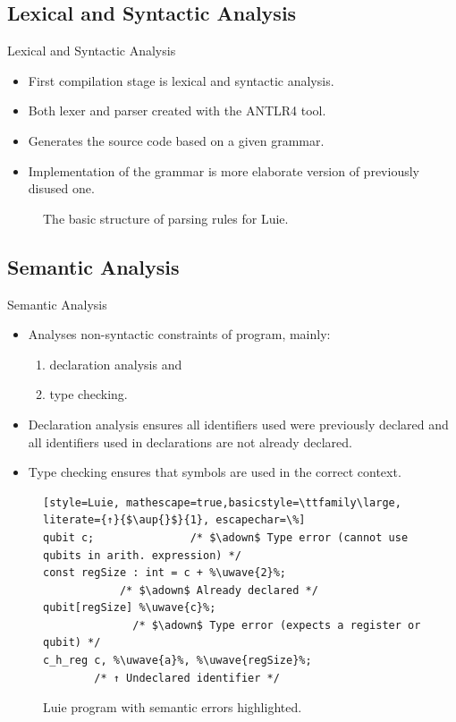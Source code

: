 \subsection{Lexical and Syntactic Analysis}
\begin{frame}{Lexical and Syntactic Analysis}
    \begin{itemize}
        \item First compilation stage is lexical and syntactic analysis.
        \item Both lexer and parser created with the ANTLR4 tool.
        \item Generates the source code based on a given grammar. 
        \item Implementation of the grammar is more elaborate version of previously disused one.
    \end{itemize}
    \begin{figure}[h]
        \centering
        
        \caption{The basic structure of parsing rules for Luie.}
    \end{figure}
\end{frame}

\subsection{Semantic Analysis}
\begin{frame}[fragile]{Semantic Analysis}
    \begin{itemize}
        \item Analyses non-syntactic constraints of program, mainly:
        \begin{enumerate}
            \item declaration analysis and
            \item type checking.
        \end{enumerate}
        \item Declaration analysis ensures all identifiers used were previously declared and all identifiers used in declarations are not already declared.
        \item Type checking ensures that symbols are used in the correct context.
    \end{itemize}
    \vfill
    \begin{figure}[htp]
        \centering     
        \begin{lstlisting}[style=Luie, mathescape=true,basicstyle=\ttfamily\large, literate={↑}{$\aup{}$}{1}, escapechar=\%] 
qubit c;               /* $\adown$ Type error (cannot use qubits in arith. expression) */       
const regSize : int = c + %\uwave{2}%; 
            /* $\adown$ Already declared */      
qubit[regSize] %\uwave{c}%;
              /* $\adown$ Type error (expects a register or qubit) */                      
c_h_reg c, %\uwave{a}%, %\uwave{regSize}%;
        /* ↑ Undeclared identifier */                 
        \end{lstlisting}
        \caption{Luie program with semantic errors highlighted.}
    \end{figure}
\end{frame}

